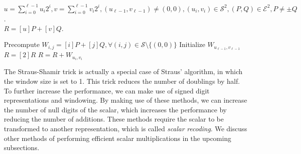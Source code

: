 \begin{algorithm}
	\algorithmicrequire  $u = \sum_{i = 0}^{\ell - 1} u_i 2^i, v = \sum_{i = 0}^{\ell - 1} v_i 2^i, (u_{\ell - 1}, v_{\ell - 1}) \neq (0, 0), (u_i, v_i) \in \mathcal{S}^2, (P, Q) \in \mathcal{E}^2, P \neq \pm Q$.\\
	\algorithmicensure $R = [u] P + [v] Q$.
	\begin{algorithmic}[1]
		\State Precompute $W_{i, j} = [i]P + [j]Q, \forall(i, j) \in \mathcal{S} \setminus \{(0, 0)\}$
		\State Initialize $W_{u_{\ell -1}, v_{\ell - 1}}$
			\State $R = [2]R$
				\State $R = R + W_{u_i, v_i}$
			\EndIf
		\EndFor
	\end{algorithmic}
	\label{algo: Straus-Shamir Trick}
\end{algorithm}
%
The Straus-Shamir trick is actually a special case of Straus' algorithm, in which the window size is set to 1.
This trick reduces the number of doublings by half.
To further increase the performance, we can make use of signed digit representations and windowing.
By making use of these methods, we can increase the number of null digits of the scalar, which increases the performance by reducing the number of additions.
These methods require the scalar to be transformed to another representation, which is called \emph{scalar recoding}.
We discuss other methods of performing efficient scalar multiplications in the upcoming subsections.

